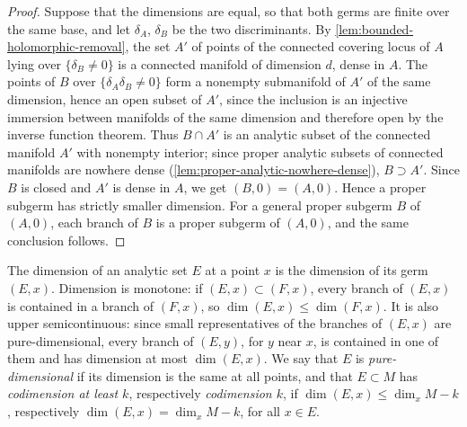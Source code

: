 \begin{proof}
Suppose that the dimensions are equal, so that both germs are finite over the same base, and let $\delta_A$, $\delta_B$ be the two discriminants. By \cref{lem:bounded-holomorphic-removal}, the set $A'$ of points of the connected covering locus of $A$ lying over $\{\delta_B\neq0\}$ is a connected manifold of dimension $d$, dense in $A$. The points of $B$ over $\{\delta_A\delta_B\neq0\}$ form a nonempty submanifold of $A'$ of the same dimension, hence an open subset of $A'$, since the inclusion is an injective immersion between manifolds of the same dimension and therefore open by the inverse function theorem. Thus $B\cap A'$ is an analytic subset of the connected manifold $A'$ with nonempty interior; since proper analytic subsets of connected manifolds are nowhere dense (\cref{lem:proper-analytic-nowhere-dense}), $B\supset A'$. Since $B$ is closed and $A'$ is dense in $A$, we get $(B,0)=(A,0)$. Hence a proper subgerm has strictly smaller dimension. For a general proper subgerm $B$ of $(A,0)$, each branch of $B$ is a proper subgerm of $(A,0)$, and the same conclusion follows.
\end{proof}

The dimension of an analytic set $E$ at a point $x$ is the dimension of its germ $(E,x)$. Dimension is monotone: if $(E,x)\subset(F,x)$, every branch of $(E,x)$ is contained in a branch of $(F,x)$, so $\dim(E,x)\leq\dim(F,x)$. It is also upper semicontinuous: since small representatives of the branches of $(E,x)$ are pure-dimensional, every branch of $(E,y)$, for $y$ near $x$, is contained in one of them and has dimension at most $\dim(E,x)$. We say that $E$ is \emph{pure-dimensional} if its dimension is the same at all points, and that $E\subset M$ has \emph{codimension at least $k$}, respectively \emph{codimension $k$}, if $\dim(E,x)\leq\dim_xM-k$, respectively $\dim(E,x)=\dim_xM-k$, for all $x\in E$.

